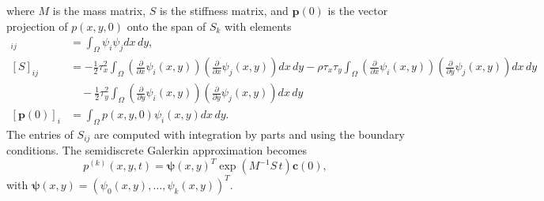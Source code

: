 \documentclass[10pt]{article}
\begin{document}
where $M$ is the mass matrix, $S$ is the stiffness matrix, and
$\mathbf{p}(0)$ is the vector projection of $p(x,y,0)$ onto the
span of $S_k$ with elements
\begin{align*}
  [M]_{ij} &= \displaystyle \int_\Omega \psi_i \psi_j dx\,dy, \\
  [S]_{ij} &= -\frac{1}{2}\tau_x^2 \displaystyle \int_\Omega \left( \frac{\partial}{\partial x} \psi_i(x,y) \right) \left( \frac{\partial}{\partial x} \psi_j(x,y) \right) dx\,dy -\rho\tau_x\tau_y \displaystyle \int_\Omega \left( \frac{\partial}{\partial x} \psi_i(x,y) \right) \left( \frac{\partial}{\partial y} \psi_j(x,y) \right) dx\,dy \\
         &\quad -\frac{1}{2}\tau_y^2 \displaystyle \int_\Omega \left( \frac{\partial}{\partial y} \psi_i(x,y) \right) \left( \frac{\partial}{\partial y} \psi_j(x,y) \right) dx\,dy \\
  [\mathbf{p}(0)]_i &= \displaystyle \int_\Omega p(x,y,0) \psi_i(x,y) dx\,dy.
\end{align*}
The entries of $S_{ij}$ are computed with integration by parts and
using the boundary conditions. The semidiscrete Galerkin approximation
becomes
\[
  p^{(k)}(x,y,t) = \boldsymbol{\psi}(x,y)^T \exp\left( M^{-1}S\, t \right) \mathbf{c}(0),
\]
with $\boldsymbol{\psi}(x,y) = (\psi_0(x,y), \ldots, \psi_k(x,y))^T.$
\end{document}
